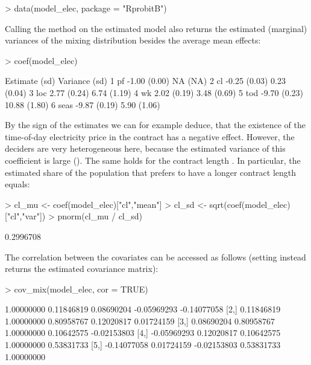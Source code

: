 \documentclass[article]{jss}
\newcommand{\fct}[1]{\code{#1()}}
\begin{document}
\begin{Schunk}
\begin{Sinput}
> data(model_elec, package = "RprobitB")
\end{Sinput}
\end{Schunk}

Calling the \fct{coef} method on the estimated model also returns the estimated (marginal) variances of the mixing distribution besides the average mean effects:

\begin{Schunk}
\begin{Sinput}
> coef(model_elec)
\end{Sinput}
\begin{Soutput}
        Estimate   (sd) Variance   (sd)
1   pf     -1.00 (0.00)       NA   (NA)
2   cl     -0.25 (0.03)     0.23 (0.04)
3  loc      2.77 (0.24)     6.74 (1.19)
4   wk      2.02 (0.19)     3.48 (0.69)
5  tod     -9.70 (0.23)    10.88 (1.80)
6 seas     -9.87 (0.19)     5.90 (1.06)
\end{Soutput}
\end{Schunk}

By the sign of the estimates we can for example deduce, that the existence of the time-of-day electricity price  in the contract has a negative effect. However, the deciders are very heterogeneous here, because the estimated variance of this coefficient is large (). The same holds for the contract length . In particular, the estimated share of the population that prefers to have a longer contract length equals:

\begin{Schunk}
\begin{Sinput}
> cl_mu <- coef(model_elec)["cl","mean"]
> cl_sd <- sqrt(coef(model_elec)["cl","var"])
> pnorm(cl_mu / cl_sd)
\end{Sinput}
\begin{Soutput}
[1] 0.2996708
\end{Soutput}
\end{Schunk}

The correlation between the covariates can be accessed as follows (setting  instead returns the estimated covariance matrix):

\begin{Schunk}
\begin{Sinput}
> cov_mix(model_elec, cor = TRUE)
\end{Sinput}
\begin{Soutput}
            [,1]       [,2]        [,3]        [,4]        [,5]
[1,]  1.00000000 0.11846819  0.08690204 -0.05969293 -0.14077058
[2,]  0.11846819 1.00000000  0.80958767  0.12020817  0.01724159
[3,]  0.08690204 0.80958767  1.00000000  0.10642575 -0.02153803
[4,] -0.05969293 0.12020817  0.10642575  1.00000000  0.53831733
[5,] -0.14077058 0.01724159 -0.02153803  0.53831733  1.00000000
\end{Soutput}
\end{Schunk}
\end{document}
